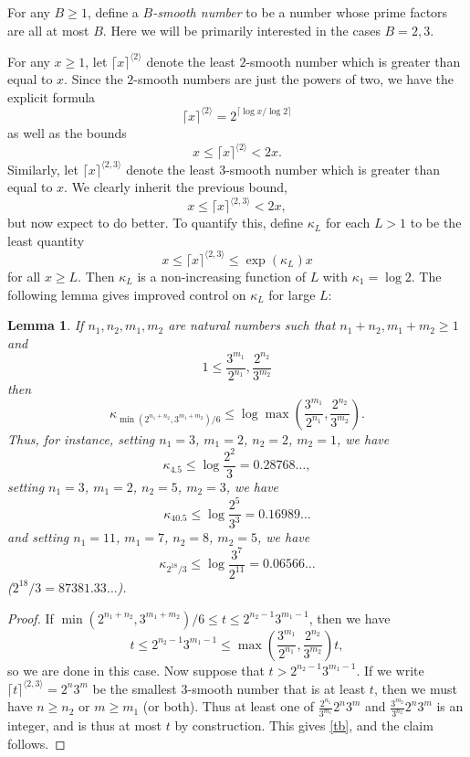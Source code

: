\documentclass[12pt,a4paper,reqno]{amsart}
\numberwithin{equation}{section}
\theoremstyle{plain}
\newtheorem{lemma}[theorem]{Lemma}
\theoremstyle{definition}
\begin{document}
For any $B \geq 1$, define a \emph{$B$-smooth number} to be a number whose prime factors are all at most $B$.  Here we will be primarily interested in the cases $B=2,3$.

For any $x \geq 1$, let $\lceil x \rceil^{\langle 2\rangle}$ denote the least $2$-smooth number which is greater than equal to $x$.  Since the $2$-smooth numbers are just the powers of two, we have the explicit formula
$$\lceil x \rceil^{\langle 2\rangle} = 2^{\lceil \log x/\log 2 \rceil}$$
as well as the bounds
$$ x \leq \lceil x \rceil^{\langle 2\rangle}  < 2x.$$
Similarly, let $\lceil x \rceil^{\langle 2,3\rangle}$ denote the least $3$-smooth number which is greater than equal to $x$.  We clearly inherit the previous bound,
$$ x \leq \lceil x \rceil^{\langle 2,3\rangle}  < 2x,$$
but now expect to do better.  To quantify this, define $\kappa_L$ for each $L > 1$ to be the least quantity 
\begin{equation}\label{kappa-def}  
  x \leq \lceil x \rceil^{\langle 2,3\rangle} \leq \exp(\kappa_L) x 
\end{equation}
for all $x \geq L$.  Then $\kappa_L$ is a non-increasing function of $L$ with $\kappa_1 = \log 2$.  The following lemma gives improved control on $\kappa_L$ for large $L$:

\begin{lemma}\label{lemcount-0}  If $n_1,n_2,m_1,m_2$ are natural numbers such that $n_1+n_2, m_1+m_2 \geq 1$ and
$$ 1 \leq \frac{3^{m_1}}{2^{n_1}}, \frac{2^{n_2}}{3^{m_2}}$$
then
$$ \kappa_{\min( 2^{n_1+n_2},3^{m_1+m_2})/6} \leq \log \max\left(\frac{3^{m_1}}{2^{n_1}}, \frac{2^{n_2}}{3^{m_2}}\right).$$
Thus, for instance, setting $n_1=3$, $m_1=2$, $n_2=2$, $m_2=1$, we have
$$ \kappa_{4.5} \leq \log \frac{2^2}{3} = 0.28768\dots,$$
setting $n_1 = 3$, $m_1 = 2$, $n_2 = 5$, $m_2 = 3$, we have
$$\kappa_{40.5} \leq \log \frac{2^5}{3^3} = 0.16989\dots$$ 
and setting $n_1 = 11$, $m_1 = 7$, $n_2 = 8$, $m_2 = 5$, we have 
$$\kappa_{2^{18}/3} \leq \log \frac{3^7}{2^{11}} = 0.06566\dots$$
($2^{18}/3 = 87381.33\dots$).
\end{lemma}

\begin{proof}  If $\min( 2^{n_1+n_2},3^{m_1+m_2})/6 \leq t \leq 2^{n_2-1} 3^{m_1-1}$, then we have
\begin{equation}\label{tb} 
  t \leq 2^{n_2-1} 3^{m_1-1} \leq \max\left(\frac{3^{m_1}}{2^{n_1}}, \frac{2^{n_2}}{3^{m_2}}\right) t,
\end{equation}
so we are done in this case.  Now suppose that $t > 2^{n_2-1} 3^{m_1-1}$.
If we write $\lceil t \rceil^{\langle 2,3 \rangle} =2^n 3^m$ be the smallest $3$-smooth number that is at least $t$, then we must have $n \geq n_2$ or $m \geq m_1$ (or both).  Thus at least one of $\frac{2^{n_1}}{3^{m_1}} 2^n 3^m$ and $\frac{3^{m_2}}{3^{n_2}} 2^n 3^m$ is an integer, and is thus at most $t$ by construction.  This gives \eqref{tb}, and the claim follows.
\end{proof}
\end{document}

